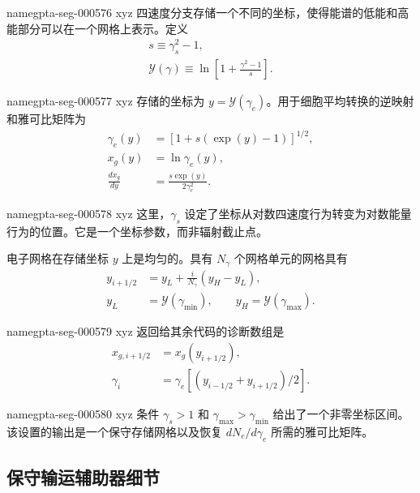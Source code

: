 \documentclass[twocolumn]{aastex702}
\makeatletter
\providecommand{\gptareaderanchor}[1]{\pdfdest name{#1} xyz}%
\providecommand{\gptareaderanchor}[1]{\special{pdf:dest (#1) [ @thispage /XYZ @xpos @ypos null ]}}%
\makeatother
\begin{document}
\gptareaderanchor{gpta-seg-000576}%
四速度分支存储一个不同的坐标，使得能谱的低能和高能部分可以在一个网格上表示。定义
\begin{equation}
\begin{gathered}
s\equiv\gamma_s^2-1,\\
\mathcal{Y}(\gamma)\equiv
\ln\left[1+\frac{\gamma^2-1}{s}\right].
\end{gathered}
\end{equation}

\gptareaderanchor{gpta-seg-000577}%
存储的坐标为 \(y=\mathcal{Y}(\gamma_e)\)。用于细胞平均转换的逆映射和雅可比矩阵为
\begin{equation}
\begin{aligned}
\gamma_e(y)&=\left[1+s(\exp(y)-1)\right]^{1/2},\\
x_g(y)&=\ln\gamma_e(y),\\
\frac{dx_g}{dy}&=\frac{s\exp(y)}{2\gamma_e^2}.
\end{aligned}
\end{equation}

\gptareaderanchor{gpta-seg-000578}%
这里，\(\gamma_s\) 设定了坐标从对数四速度行为转变为对数能量行为的位置。它是一个坐标参数，而非辐射截止点。

电子网格在存储坐标 \(y\) 上是均匀的。具有 \(N_\gamma\) 个网格单元的网格具有
\begin{equation}
\begin{aligned}
y_{i+1/2}&=y_L+\frac{i}{N_\gamma}(y_H-y_L),\\
y_L&=\mathcal{Y}(\gamma_{\min}),\qquad
y_H=\mathcal{Y}(\gamma_{\max}).
\end{aligned}
\end{equation}

\gptareaderanchor{gpta-seg-000579}%
返回给其余代码的诊断数组是
\begin{equation}
\begin{aligned}
x_{g,i+1/2}&=x_g(y_{i+1/2}),\\
\gamma_i&=\gamma_e\!\left[(y_{i-1/2}+y_{i+1/2})/2\right].
\end{aligned}
\end{equation}

\gptareaderanchor{gpta-seg-000580}%
条件 \(\gamma_s>1\) 和 \(\gamma_{\max}>\gamma_{\min}\) 给出了一个非零坐标区间。该设置的输出是一个保守存储网格以及恢复 \(dN_e/d\gamma_e\) 所需的雅可比矩阵。

\subsection{保守输运辅助器细节}
\end{document}
